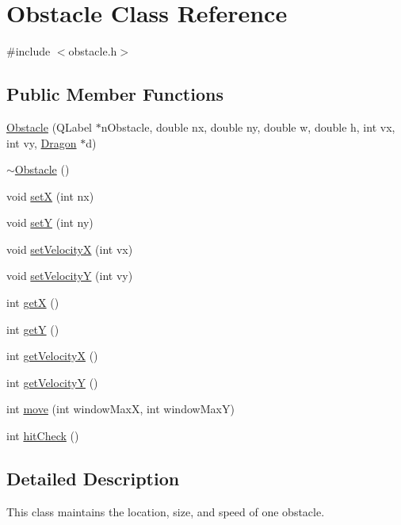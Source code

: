 \hypertarget{classObstacle}{\section{\-Obstacle \-Class \-Reference}
\label{classObstacle}
}


{\ttfamily \#include $<$obstacle.\-h$>$}

\subsection*{\-Public \-Member \-Functions}
\begin{DoxyCompactItemize}
\item 
\hyperlink{classObstacle_acdb7e6ba75239ea96d88cf7f33b3ef03}{\-Obstacle} (\-Q\-Label $\ast$n\-Obstacle, double nx, double ny, double w, double h, int vx, int vy, \hyperlink{classDragon}{\-Dragon} $\ast$d)
\item 
\hyperlink{classObstacle_af2f9cc9c6cff75dca0974fd5ac4f71a9}{$\sim$\-Obstacle} ()
\item 
void \hyperlink{classObstacle_a85b2b36f6b44e6e8d7efd82b7187f6b1}{set\-X} (int nx)
\item 
void \hyperlink{classObstacle_a81208a9ba42ebd71a820bc3e501e17ff}{set\-Y} (int ny)
\item 
void \hyperlink{classObstacle_a98cfcddb6bfe6ed8776c8f4a156dba50}{set\-Velocity\-X} (int vx)
\item 
void \hyperlink{classObstacle_a26509e4052a4031d4a66f8c052b33180}{set\-Velocity\-Y} (int vy)
\item 
int \hyperlink{classObstacle_a5ea4b68aa9ce866b74ef4a3e0374da25}{get\-X} ()
\item 
int \hyperlink{classObstacle_aff69e24229b9cf01011d5cb29fe2d532}{get\-Y} ()
\item 
int \hyperlink{classObstacle_aa6a4321df2bb9f6ca80f7a0e14e54b31}{get\-Velocity\-X} ()
\item 
int \hyperlink{classObstacle_ac4c638678eb4a168543a98d2fc83ee31}{get\-Velocity\-Y} ()
\item 
int \hyperlink{classObstacle_afad6e7c04bcfc69909e3ba0875662fa9}{move} (int window\-Max\-X, int window\-Max\-Y)
\item 
int \hyperlink{classObstacle_a6e5a041c22edafd47b549f85a08c801b}{hit\-Check} ()
\end{DoxyCompactItemize}


\subsection{\-Detailed \-Description}
\-This class maintains the location, size, and speed of one obstacle. 

